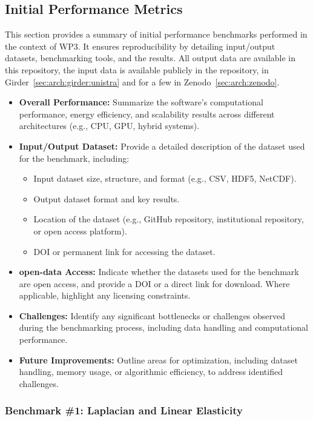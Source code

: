 \subsection{Initial Performance Metrics}
\label{sec:WP3:Feelpp:metrics}

This section provides a summary of initial performance benchmarks performed in the context of WP3. It ensures reproducibility by detailing input/output datasets, benchmarking tools, and the results.
All output data are available in this repository, the input data is available publicly in the \Feelpp repository, in Girder~\cref{sec:arch:girder:unistra} and for a few in Zenodo~\cref{sec:arch:zenodo}.

\iffalse
\begin{itemize}
    \item \textbf{Overall Performance:} Summarize the software's computational performance, energy efficiency, and scalability results across different architectures (e.g., CPU, GPU, hybrid systems).
    \item \textbf{Input/Output Dataset:} Provide a detailed description of the dataset used for the benchmark, including:
        \begin{itemize}
            \item Input dataset size, structure, and format (e.g., CSV, HDF5, NetCDF).
            \item Output dataset format and key results.
            \item Location of the dataset (e.g., GitHub repository, institutional repository, or open access platform).
            \item DOI or permanent link for accessing the dataset.
        \end{itemize}
    \item \textbf{open-data Access:} Indicate whether the datasets used for the benchmark are open access, and provide a DOI or a direct link for download. Where applicable, highlight any licensing constraints.
    \item \textbf{Challenges:} Identify any significant bottlenecks or challenges observed during the benchmarking process, including data handling and computational performance.
    \item \textbf{Future Improvements:} Outline areas for optimization, including dataset handling, memory usage, or algorithmic efficiency, to address identified challenges.
\end{itemize}

\subsubsection{Benchmark \#1: Laplacian and Linear Elasticity}
